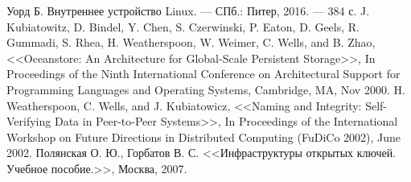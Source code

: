 \begin{thebibliography}{}
	Уорд Б. Внутреннее устройство Linux. — СПб.: Питер, 2016. — 384 с.
	J. Kubiatowitz, D. Bindel, Y. Chen, S. Czerwinski, P. Eaton, D. Geels, R. Gummadi, S. Rhea, H. Weatherspoon, W. Weimer, C. Wells, and B. Zhao, <<Oceanstore: An Architecture for Global-Scale Persistent Storage>>, In Proceedings of the Ninth International Conference on Architectural Support for Programming Languages and Operating Systems, Cambridge, MA, Nov 2000.
	H. Weatherspoon, C. Wells, and J. Kubiatowicz, <<Naming and Integrity: Self-Verifying Data in Peer-to-Peer Systems>>, In Proceedings of the International Workshop on Future Directions in Distributed Computing (FuDiCo 2002), June 2002.
	Полянская О. Ю., Горбатов В. С. <<Инфраструктуры открытых ключей. Учебное пособие.>>, Москва, 2007.
\end{thebibliography}
\endgroup

\pagebreak
